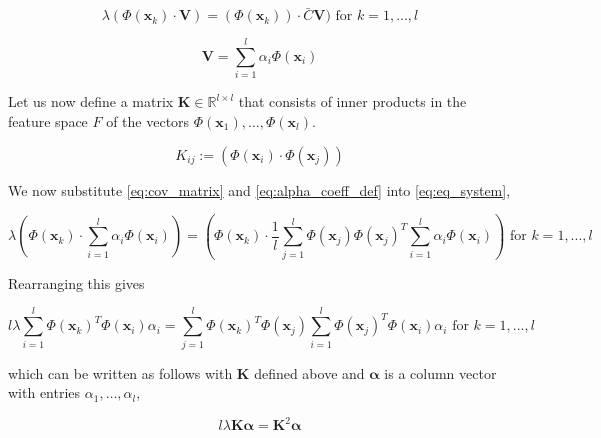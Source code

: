 \begin{equation} \label{eq:eq_system}
\lambda (\Phi(\textbf{x}_k) \cdot \textbf{V}) = (\Phi(\textbf{x}_k)) \cdot \bar{C} \textbf{V})\text{ for }k = 1,...,l
\end{equation}


\begin{equation} \label{eq:alpha_coeff_def}
\textbf{V} = \sum\limits_{i=1}^{l} \alpha_i \Phi(\textbf{x}_i)
\end{equation}


Let us now define a matrix $\textbf{K}\in \mathbb{R}^{l\times l}$ that consists of inner products in the feature space $F$ of the vectors $\Phi(\textbf{x}_1),\dots,\Phi(\textbf{x}_l)$.

\begin{equation} \label{eq:k_matrix}
K_{ij} := (\Phi(\textbf{x}_i) \cdot \Phi(\textbf{x}_j))
\end{equation}

We now substitute \eqref{eq:cov_matrix} and \eqref{eq:alpha_coeff_def} into \eqref{eq:eq_system},

\begin{equation*}
\lambda (\Phi(\textbf{x}_k) \cdot \sum\limits_{i=1}^{l} \alpha_i \Phi(\textbf{x}_i)) = (\Phi(\textbf{x}_k) \cdot \frac{1}{l} \sum\limits_{j=1}^{l} \Phi(\textbf{x}_j) \Phi(\textbf{x}_j)^T \sum\limits_{i=1}^{l} \alpha_i \Phi(\textbf{x}_i))\text{ for }k = 1,...,l
\end{equation*}

Rearranging this gives

\begin{equation*}
 l \lambda \sum\limits_{i=1}^{l} \Phi(\textbf{x}_k)^T \Phi(\textbf{x}_i) \alpha_i = \sum\limits_{j=1}^{l} \Phi(\textbf{x}_k)^T \Phi(\textbf{x}_j) \sum\limits_{i=1}^{l} \Phi(\textbf{x}_j)^T \Phi(\textbf{x}_i) \alpha_i\text{ for }k = 1,...,l
\end{equation*}


which can be written as follows with \textbf{K} defined above and $\boldsymbol{\alpha}$ is a column vector with entries $\alpha_1,\dots,\alpha_l$,

\begin{equation} \label{eq:problem}
l \lambda \textbf{K} \boldsymbol{\alpha} = \textbf{K}^2 \boldsymbol{\alpha}
\end{equation}

